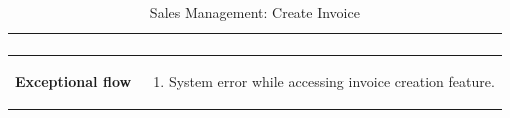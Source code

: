 \documentclass[../thesis.tex]{subfiles}
\begin{document}
\begin{center}
\begin{table}[H]
{\begin{tabular}[htbp]{|p{}|p{}|}
\begin{enumerate}
                                                   \end{enumerate}\\ \hline
                \textbf{Exceptional flow       } & \begin{enumerate}
                                                       \item System error while accessing invoice creation feature.
                                                   \end{enumerate} \\ \hline
            \end{tabular}%
        }
        \caption{Sales Management: Create Invoice}
        \label{tab:table-usecase-create-invoice}


    \end{table}
\end{center}
\end{document}

